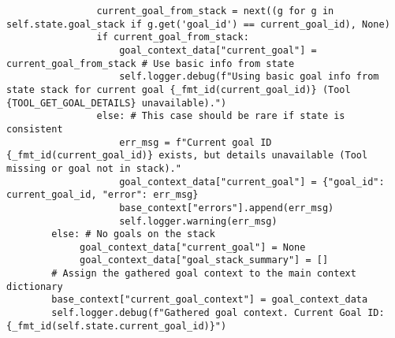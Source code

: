 \documentclass[12pt,a4paper]{article}
\begin{document}
\begin{pageablecode}
\begin{verbatim}
                current_goal_from_stack = next((g for g in self.state.goal_stack if g.get('goal_id') == current_goal_id), None)
                if current_goal_from_stack:
                    goal_context_data["current_goal"] = current_goal_from_stack # Use basic info from state
                    self.logger.debug(f"Using basic goal info from state stack for current goal {_fmt_id(current_goal_id)} (Tool {TOOL_GET_GOAL_DETAILS} unavailable).")
                else: # This case should be rare if state is consistent
                    err_msg = f"Current goal ID {_fmt_id(current_goal_id)} exists, but details unavailable (Tool missing or goal not in stack)."
                    goal_context_data["current_goal"] = {"goal_id": current_goal_id, "error": err_msg}
                    base_context["errors"].append(err_msg)
                    self.logger.warning(err_msg)
        else: # No goals on the stack
             goal_context_data["current_goal"] = None
             goal_context_data["goal_stack_summary"] = []
        # Assign the gathered goal context to the main context dictionary
        base_context["current_goal_context"] = goal_context_data
        self.logger.debug(f"Gathered goal context. Current Goal ID: {_fmt_id(self.state.current_goal_id)}")


\end{verbatim}
\end{pageablecode}
\end{document}
